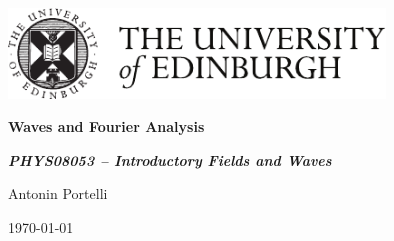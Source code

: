 \documentclass[a4paper,12pt]{book}
\theoremstyle{plain}
\theoremstyle{plain}
\theoremstyle{plain}
\theoremstyle{plain}
\theoremstyle{definition}
\theoremstyle{definition}
\begin{document}
\pagestyle{plain}
\frontmatter
\thispagestyle{empty}
\vspace*{-0.065\textheight}
\hfill\includegraphics[width=10cm]{UoE_Stacked Logo_Black_v1_160215.pdf}
\vfill
\vspace{0.15\textheight}
\parbox{0.9\linewidth}{\fontsize{32pt}{36pt}\selectfont\raggedright\textbf{Waves
and Fourier Analysis}\par}

\vspace{0.03\textheight}
{\Large\textit{\textbf{PHYS08053 -- Introductory Fields and Waves}}\par}
\vfill
{\Large Antonin Portelli\par}
\vfill\vfill\vfill
{\large\today\par}
\thispagestyle{empty}
\newpage
\end{document}
